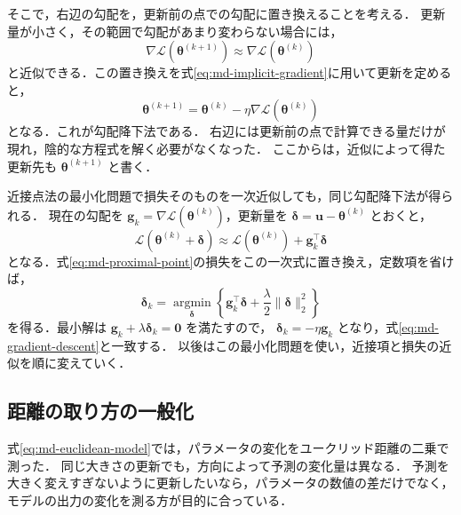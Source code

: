 \documentclass[../main.tex]{subfiles}
\begin{document}
そこで，右辺の勾配を，更新前の点での勾配に置き換えることを考える．
更新量が小さく，その範囲で勾配があまり変わらない場合には，
\begin{equation}
  \nabla\mathcal{L}(\bm{\theta}^{(k+1)})
  \approx\nabla\mathcal{L}(\bm{\theta}^{(k)})
  \label{eq:md-gradient-approximation}
\end{equation}
と近似できる．この置き換えを式\eqref{eq:md-implicit-gradient}に用いて更新を定めると，
\begin{equation}
  \bm{\theta}^{(k+1)}=\bm{\theta}^{(k)}
  -\eta\nabla\mathcal{L}(\bm{\theta}^{(k)})
  \label{eq:md-gradient-descent}
\end{equation}
となる．これが勾配降下法である．
右辺には更新前の点で計算できる量だけが現れ，陰的な方程式を解く必要がなくなった．
ここからは，近似によって得た更新先も $\bm{\theta}^{(k+1)}$ と書く．

近接点法の最小化問題で損失そのものを一次近似しても，同じ勾配降下法が得られる．
現在の勾配を $\bm{g}_k=\nabla\mathcal{L}(\bm{\theta}^{(k)})$，更新量を
$\bm{\delta}=\bm{u}-\bm{\theta}^{(k)}$ とおくと，
\begin{equation}
  \mathcal{L}(\bm{\theta}^{(k)}+\bm{\delta})
  \approx\mathcal{L}(\bm{\theta}^{(k)})+\bm{g}_k^\top\bm{\delta}
  \label{eq:md-linear-loss}
\end{equation}
となる．式\eqref{eq:md-proximal-point}の損失をこの一次式に置き換え，定数項を省けば，
\begin{equation}
  \bm{\delta}_k=\underset{\bm{\delta}}{\operatorname{argmin}}
  \left\{\bm{g}_k^\top\bm{\delta}
  +\frac{\lambda}{2}\|\bm{\delta}\|_2^2\right\}
  \label{eq:md-euclidean-model}
\end{equation}
を得る．最小解は $\bm{g}_k+\lambda\bm{\delta}_k=\bm{0}$ を満たすので，
$\bm{\delta}_k=-\eta\bm{g}_k$ となり，式\eqref{eq:md-gradient-descent}と一致する．
以後はこの最小化問題を使い，近接項と損失の近似を順に変えていく．

\subsection{距離の取り方の一般化}

式\eqref{eq:md-euclidean-model}では，パラメータの変化をユークリッド距離の二乗で測った．
同じ大きさの更新でも，方向によって予測の変化量は異なる．
予測を大きく変えすぎないように更新したいなら，パラメータの数値の差だけでなく，モデルの出力の変化を測る方が目的に合っている．
\end{document}
